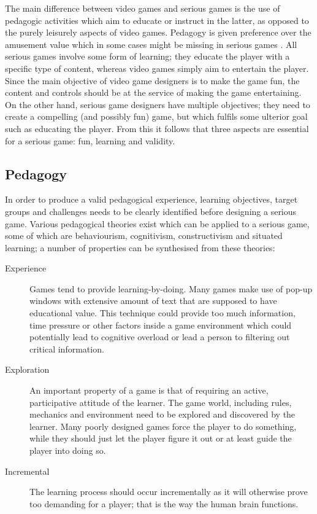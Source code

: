 The main difference between video games and serious games is the use of pedagogic activities which aim to educate or instruct in the latter, as opposed to the purely leisurely aspects of video games\cite{zyda2005visual}. Pedagogy is given preference over the amusement value which in some cases might be missing in serious games \cite{zyda2005visual}. All serious games involve some form of learning; they educate the player with a specific type of content, whereas video games simply aim to entertain the player\cite{Harteveld2007}. Since the main objective of video game designers is to make the game fun, the content and controls should be at the service of making the game entertaining. On the other hand, serious game designers have multiple objectives; they need to create a compelling (and possibly fun) game, but which fulfils some ulterior goal such as educating the player.  From this it follows that three aspects are essential for a serious game: fun, learning and validity\cite{Harteveld2007}.

\subsection{Pedagogy}
In order to produce a valid pedagogical experience, learning objectives, target groups and challenges needs to be clearly identified before designing a serious game\cite{moser2002methodology}. Various pedagogical theories exist which can be applied to a serious game, some of which are behaviourism, cognitivism, constructivism and situated learning\cite{egenfeldt2005beyond}; a number of properties can be synthesised from these theories: 

\begin{description}
\item[Experience] Games tend to provide learning-by-doing. Many games make use of pop-up windows with extensive amount of text that are supposed to have educational value. This technique could provide too much information, time pressure or other factors inside a game environment which could potentially lead to cognitive overload or lead a person to filtering out critical information\cite{egenfeldt2005beyond}.

\item[Exploration] An important property of a game is that of requiring an active, participative attitude of the learner. The game world, including rules, mechanics and environment need to be explored and discovered by the learner. Many poorly designed games force the player to do something, while they should just let the player figure it out or at least guide the player into doing so.

\item[Incremental] The learning process should occur incrementally as it will otherwise prove too demanding for a player; that is the way the human brain functions\cite{moser2002methodology}.
\end{description}

